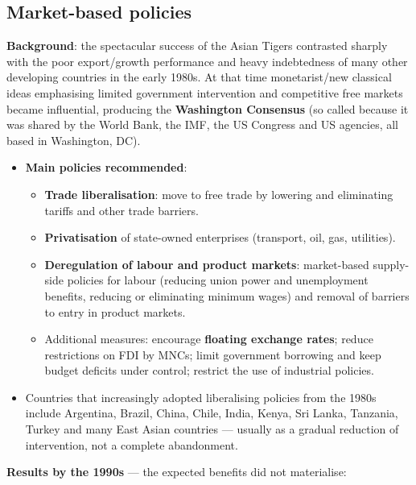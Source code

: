 \documentclass[a4paper,12pt]{article}
\newcommand{\needbold}[1]{\textcolor{red!70!black}{\textbf{#1}}}
\begin{document}
\subsection{Market-based policies}
\textbf{Background}: the spectacular success of the Asian Tigers contrasted sharply with the poor export/growth performance and heavy indebtedness of many other developing countries in the early 1980s. At that time monetarist/new classical ideas emphasising limited government intervention and competitive free markets became influential, producing the \needbold{Washington Consensus} (so called because it was shared by the World Bank, the IMF, the US Congress and US agencies, all based in Washington, DC).
\begin{itemize}
  \item \textbf{Main policies recommended}:
  \begin{itemize}
    \item \textbf{Trade liberalisation}: move to free trade by lowering and eliminating tariffs and other trade barriers.
    \item \textbf{Privatisation} of state-owned enterprises (transport, oil, gas, utilities).
    \item \textbf{Deregulation of labour and product markets}: market-based supply-side policies for labour (reducing union power and unemployment benefits, reducing or eliminating minimum wages) and removal of barriers to entry in product markets.
    \item Additional measures: encourage \textbf{floating exchange rates}; reduce restrictions on FDI by MNCs; limit government borrowing and keep budget deficits under control; restrict the use of industrial policies.
  \end{itemize}
  \item Countries that increasingly adopted liberalising policies from the 1980s include Argentina, Brazil, China, Chile, India, Kenya, Sri Lanka, Tanzania, Turkey and many East Asian countries --- usually as a gradual reduction of intervention, not a complete abandonment.
\end{itemize}
\textbf{Results by the 1990s} --- the expected benefits did not materialise:
\end{document}
